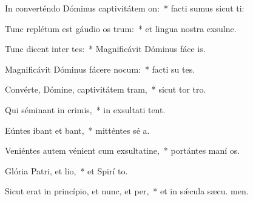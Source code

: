 \item In converténdo Dóminus captivitátem on:~* facti sumus sicut ti:
\item Tunc replétum est gáudio os trum:~* et lingua nostra exsulne.
\item Tunc dicent inter tes:~* Magnificávit Dóminus fáce  is.
\item Magnificávit Dóminus fácere nocum:~* facti su tes.
\item Convérte, Dómine, captivitátem tram,~* sicut tor  tro.
\item Qui séminant in crimis,~* in exsultati tent.
\item Eúntes ibant et bant,~* mitténtes sé a.
\item Veniéntes autem vénient cum exsultatine,~* portántes maní os.
\item Glória Patri, et lio,~* et Spirí to.
\item Sicut erat in princípio, et nunc, et per,~* et in sǽcula sæcu. men.
